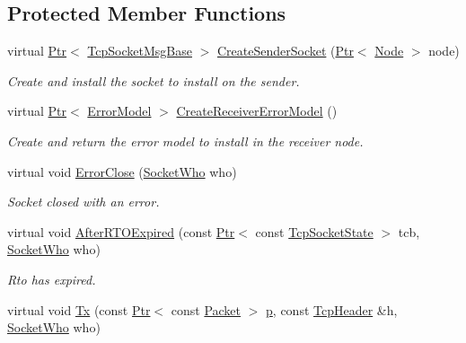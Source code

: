 \subsection*{Protected Member Functions}
\begin{DoxyCompactItemize}
\item 
virtual \hyperlink{classns3_1_1Ptr}{Ptr}$<$ \hyperlink{classns3_1_1TcpSocketMsgBase}{Tcp\+Socket\+Msg\+Base} $>$ \hyperlink{classTcpTimeRtoTest_a1de56f4678c729df31417a732dadac91}{Create\+Sender\+Socket} (\hyperlink{classns3_1_1Ptr}{Ptr}$<$ \hyperlink{classns3_1_1Node}{Node} $>$ node)
\begin{DoxyCompactList}\small\item\em Create and install the socket to install on the sender. \end{DoxyCompactList}\item 
virtual \hyperlink{classns3_1_1Ptr}{Ptr}$<$ \hyperlink{classns3_1_1ErrorModel}{Error\+Model} $>$ \hyperlink{classTcpTimeRtoTest_ab9f68845369259b334d796ce9f92c7cd}{Create\+Receiver\+Error\+Model} ()
\begin{DoxyCompactList}\small\item\em Create and return the error model to install in the receiver node. \end{DoxyCompactList}\item 
virtual void \hyperlink{classTcpTimeRtoTest_af928664828409543ac2e0bf4a129bb60}{Error\+Close} (\hyperlink{classns3_1_1TcpGeneralTest_a29338e6b7137cad650c2ff835713f6ee}{Socket\+Who} who)
\begin{DoxyCompactList}\small\item\em Socket closed with an error. \end{DoxyCompactList}\item 
virtual void \hyperlink{classTcpTimeRtoTest_a6df1dee158b75cb0e8dff8dd0603ab1b}{After\+R\+T\+O\+Expired} (const \hyperlink{classns3_1_1Ptr}{Ptr}$<$ const \hyperlink{classns3_1_1TcpSocketState}{Tcp\+Socket\+State} $>$ tcb, \hyperlink{classns3_1_1TcpGeneralTest_a29338e6b7137cad650c2ff835713f6ee}{Socket\+Who} who)
\begin{DoxyCompactList}\small\item\em Rto has expired. \end{DoxyCompactList}\item 
virtual void \hyperlink{classTcpTimeRtoTest_ae8f215f01bf8d8f198c5701029f60b1e}{Tx} (const \hyperlink{classns3_1_1Ptr}{Ptr}$<$ const \hyperlink{classns3_1_1Packet}{Packet} $>$ \hyperlink{lte__link__budget__x2__handover__measures_8m_ac9de518908a968428863f829398a4e62}{p}, const \hyperlink{classns3_1_1TcpHeader}{Tcp\+Header} \&h, \hyperlink{classns3_1_1TcpGeneralTest_a29338e6b7137cad650c2ff835713f6ee}{Socket\+Who} who)

\end{DoxyCompactItemize}

